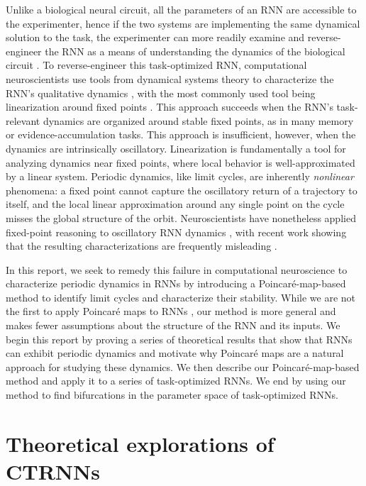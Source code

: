 \documentclass[11pt, letterpaper]{article}
\begin{document}
Unlike a biological neural circuit, all the parameters of an RNN are accessible to the experimenter, hence if the two systems are implementing the same dynamical solution to the task, the experimenter can more readily examine and reverse-engineer the RNN as a means of understanding the dynamics of the biological circuit \citep{sussillo2014neural,barak2017recurrent}. To reverse-engineer this task-optimized RNN, computational neuroscientists use tools from dynamical systems theory to characterize the RNN's qualitative dynamics \citep{sussillo2013opening,vyas2020computation}, with the most commonly used tool being linearization around fixed points \citep{sussillo2013opening,golub2018fixedpointfinder}. This approach succeeds when the RNN's task-relevant dynamics are organized around stable fixed points, as in many memory or evidence-accumulation tasks. This approach is insufficient, however, when the dynamics are intrinsically oscillatory. Linearization is fundamentally a tool for analyzing dynamics near fixed points, where local behavior is well-approximated by a linear system. Periodic dynamics, like limit cycles, are inherently \emph{nonlinear} phenomena: a fixed point cannot capture the oscillatory return of a trajectory to itself, and the local linear approximation around any single point on the cycle misses the global structure of the orbit. Neuroscientists have nonetheless applied fixed-point reasoning to oscillatory RNN dynamics \citep{sussillo2013opening,maheswaranathan2019universality,ostrow2023beyond}, with recent work showing that the resulting characterizations are frequently misleading \citep{shinn2023phantom}.

In this report, we seek to remedy this failure in computational neuroscience to characterize periodic dynamics in RNNs by introducing a Poincar\'e-map-based method to identify limit cycles and characterize their stability. While we are not the first to apply Poincar\'e maps to RNNs \citep{sato2000poincare,pals2024trained}, our method is more general and makes fewer assumptions about the structure of the RNN and its inputs. We begin this report by proving a series of theoretical results that show that RNNs can exhibit periodic dynamics and motivate why Poincar\'e maps are a natural approach for studying these dynamics. We then describe our Poincar\'e-map-based method and apply it to a series of task-optimized RNNs. We end by using our method to find bifurcations in the parameter space of task-optimized RNNs.

\section{Theoretical explorations of CTRNNs}\label{sec:analytical_ctrnn}
\end{document}
